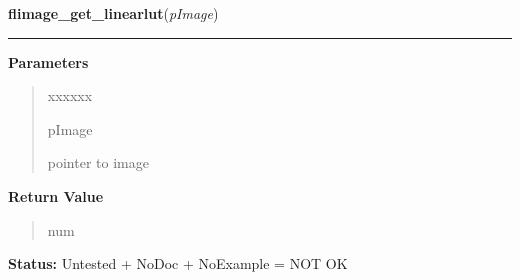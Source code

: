 \hspace{.8\funcindent}\begin{boxedminipage}{\funcwidth}

    \raggedright \textbf{flimage\_get\_linearlut}(\textit{pImage})

    \vspace{-1.5ex}

    \rule{\textwidth}{0.5\fboxrule}
\setlength{\parskip}{2ex}
\setlength{\parskip}{1ex}
      \textbf{Parameters}
      \vspace{-1ex}

      \begin{quote}
        \begin{Ventry}{xxxxxx}

          \item[pImage]

          pointer to image

        \end{Ventry}

      \end{quote}

      \textbf{Return Value}
    \vspace{-1ex}

      \begin{quote}
      num

      \end{quote}

\textbf{Status:} Untested + NoDoc + NoExample = NOT OK



    \end{boxedminipage}

    \label{xformslib:library:flimage_invalidate_pixels}

    \vspace{0.5ex}

